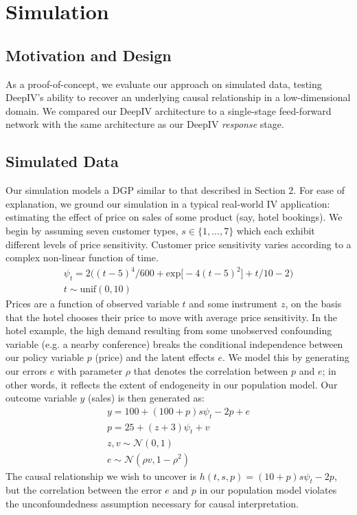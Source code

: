 \documentclass[10.5pt, oneside, twocolumn]{article}   	%
\begin{document}
\section{Simulation}
\subsection{Motivation and Design}
As a proof-of-concept, we evaluate our approach on simulated data, testing DeepIV's ability to recover an underlying causal relationship in a low-dimensional domain. We compared our DeepIV architecture to a single-stage feed-forward network with the same architecture as our  DeepIV \emph{response} stage. 

\subsection{Simulated Data}
Our simulation models a DGP similar to that described in Section 2. For ease of explanation, we ground our simulation in a typical real-world IV application: estimating the effect of price on sales of some product (say, hotel bookings). We begin by assuming seven customer types, $s \in \{1,...,7\}$ which each exhibit different levels of price sensitivity. Customer price sensitivity varies according to a complex non-linear function of time.
\begin{gather*}
\psi_t = 2\big((t-5)^4/600 + \textrm{exp}\big[-4(t-5)^2\big] + t/10 - 2 \big)\\
t \sim \textrm{unif}(0,10)
\end{gather*}
Prices are a function of observed variable $t$ and some instrument $z$, on the basis that the hotel chooses their price to move with average price sensitivity. In the hotel example, the high demand resulting from some unobserved confounding variable (e.g. a nearby conference) breaks the conditional independence between our policy variable $p$ (price) and the latent effects $e$. We model this by generating our errors $e$ with parameter $\rho$ that denotes the correlation between $p$ and $e$; in other words, it reflects the extent of endogeneity in our population model. Our outcome variable $y$ (sales) is then generated as:
\begin{gather*}
y = 100 + (100 + p)s\psi_t - 2p + e \\
p = 25 + (z + 3)\psi_t + v \\
z, v \sim \mathcal{N}(0,1) \\
e \sim \mathcal{N}(\rho v, 1 - \rho^2)
\end{gather*}
The causal relationship we wish to uncover is $h(t, s, p) = (10 + p)s\psi_t - 2p$, but the correlation between the error $e$ and $p$ in our population model violates the unconfoundedness assumption necessary for causal interpretation. \\
\end{document}
